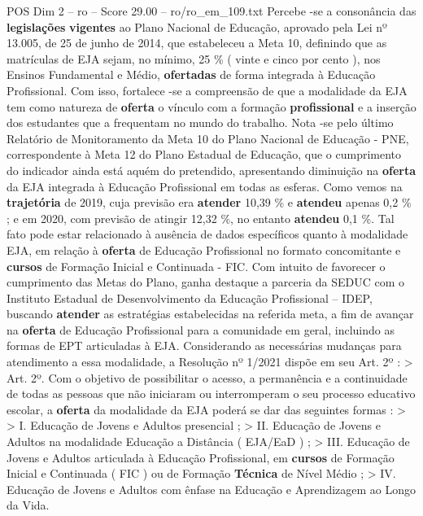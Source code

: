 \begin{textsample}{POS Dim 2 – ro – Score 29.00 – ro/ro\_em\_109.txt}
Percebe -se a consonância das \textbf{legislações} \textbf{vigentes} ao Plano Nacional de Educação, aprovado pela Lei nº 13.005, de 25 de junho de 2014, que estabeleceu a Meta 10, definindo que as matrículas de EJA sejam, no mínimo, 25 \% ( vinte e cinco por cento ), nos Ensinos Fundamental e Médio, \textbf{ofertadas} de forma integrada à Educação Profissional.
Com isso, fortalece -se a compreensão de que a modalidade da EJA tem como natureza de \textbf{oferta} o vínculo com a formação \textbf{profissional} e a inserção dos estudantes que a frequentam no mundo do trabalho.
Nota -se pelo último Relatório de Monitoramento da Meta 10 do Plano Nacional de Educação - PNE, correspondente à Meta 12 do Plano Estadual de Educação, que o cumprimento do indicador ainda está aquém do pretendido, apresentando diminuição na \textbf{oferta} da EJA integrada à Educação Profissional em todas as esferas.
Como vemos na \textbf{trajetória} de 2019, cuja previsão era \textbf{atender} 10,39 \% e \textbf{atendeu} apenas 0,2 \% ; e em 2020, com previsão de atingir 12,32 \%, no entanto \textbf{atendeu} 0,1 \%.
Tal fato pode estar relacionado à ausência de dados específicos quanto à modalidade EJA, em relação à \textbf{oferta} de Educação Profissional no formato concomitante e \textbf{cursos} de Formação Inicial e Continuada - FIC.
Com intuito de favorecer o cumprimento das Metas do Plano, ganha destaque a parceria da SEDUC com o Instituto Estadual de Desenvolvimento da Educação Profissional – IDEP, buscando \textbf{atender} as estratégias estabelecidas na referida meta, a fim de avançar na \textbf{oferta} de Educação Profissional para a comunidade em geral, incluindo as formas de EPT articuladas à EJA.
Considerando as necessárias mudanças para atendimento a essa modalidade, a Resolução nº 1/2021 dispõe em seu Art. 2º : > Art. 2º.
Com o objetivo de possibilitar o acesso, a permanência e a continuidade de todas as pessoas que não iniciaram ou interromperam o seu processo educativo escolar, a \textbf{oferta} da modalidade da EJA poderá se dar das seguintes formas : > > I.
Educação de Jovens e Adultos presencial ; > II.
Educação de Jovens e Adultos na modalidade Educação a Distância ( EJA/EaD ) ; > III.
Educação de Jovens e Adultos articulada à Educação Profissional, em \textbf{cursos} de Formação Inicial e Continuada ( FIC ) ou de Formação \textbf{Técnica} de Nível Médio ; > IV.
Educação de Jovens e Adultos com ênfase na Educação e Aprendizagem ao Longo da Vida.

\end{textsample}
